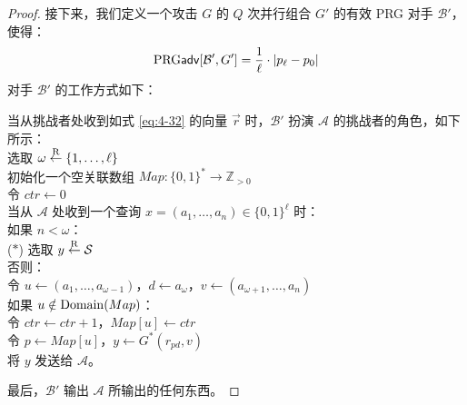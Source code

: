 \begin{proof}
接下来，我们定义一个攻击 $G$ 的 $Q$ 次并行组合 $G'$ 的有效 PRG 对手 $\mathcal{B}'$，使得：
\[
{\rm PRG}\mathsf{adv}[\mathcal{B}',G']=\frac{1}{\ell}\cdot|p_\ell-p_0|
\]
对手 $\mathcal{B}'$ 的工作方式如下：

\vspace{5pt}

\hspace*{5pt} 当从挑战者处收到如式 \ref{eq:4-32} 的向量 $\vec r$ 时，$\mathcal{B}'$ 扮演 $\mathcal{A}$ 的挑战者的角色，如下所示：\\
\hspace*{50pt} 选取 $\omega\overset{\rm R}\leftarrow\{1,\dots,\ell\}$\\
\hspace*{50pt} 初始化一个空关联数组 $Map:\{0,1\}^*\to\mathbb{Z}_{>0}$\\
\hspace*{50pt} 令 $ctr\leftarrow 0$\\
\hspace*{50pt} 当从 $\mathcal{A}$ 处收到一个查询 $x=(a_1,\dots,a_n)\in\{0,1\}^\ell$ 时：\\
\hspace*{75pt} 如果 $n<\omega$：\\
\hspace*{11pt} ($*$)
\hspace*{69pt} 选取 $y\overset{\rm R}\leftarrow\mathcal{S}$\\
\hspace*{75pt} 否则：\\
\hspace*{100pt} 令 $u\leftarrow(a_1,\dots,a_{\omega-1})$，$d\leftarrow a_\omega$，$v\leftarrow(a_{\omega+1},\dots,a_n)$\\
\hspace*{100pt} 如果 $u\notin{\rm Domain}(Map)$：\\
\hspace*{125pt} 令 $ctr\leftarrow ctr+1$，$Map[u]\leftarrow ctr$\\
\hspace*{100pt} 令 $p\leftarrow Map[u]$，$y\leftarrow G^*(r_{pd},v)$\\
\hspace*{75pt} 将 $y$ 发送给 $\mathcal{A}$。

\vspace{3pt}

\hspace*{5pt} 最后，$\mathcal{B}'$ 输出 $\mathcal{A}$ 所输出的任何东西。

\vspace{5pt}


\end{proof}
